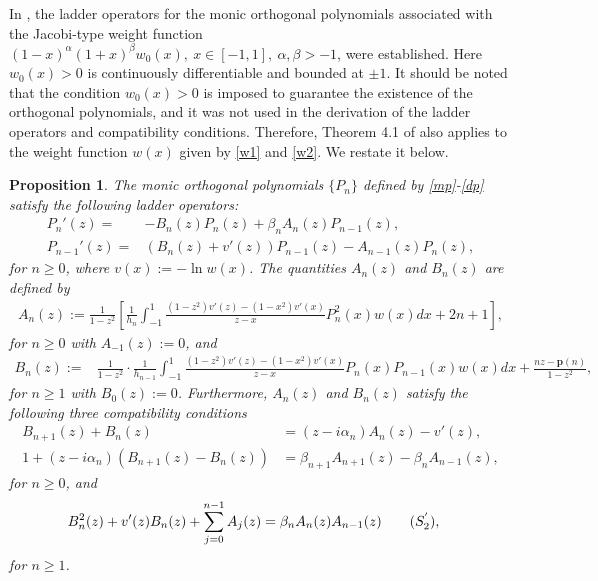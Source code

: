\documentclass[11pt,a4paper]{article}
\newtheorem{proposition}[theorem]{Proposition}
\numberwithin{equation}{section}
\begin{document}
In \cite{LyuLyu25}, the ladder operators for the monic orthogonal polynomials associated with the Jacobi-type weight function
$(1-x)^{\alpha}(1+x)^{\beta}w_0(x),~ x\in[-1,1],~\alpha,\beta>-1$,
were established. Here $w_0(x)>0$ is continuously differentiable and bounded at $\pm1$. It should be noted that the condition $w_0(x)>0$ is imposed to guarantee the existence of the orthogonal polynomials, and it was not used in the derivation of the ladder operators and compatibility conditions. Therefore, Theorem 4.1 of \cite{LyuLyu25} also applies to the weight function $w(x)$ given by \eqref{w1} and \eqref{w2}. We restate it below.
\begin{proposition}
The monic orthogonal polynomials $\{P_n\}$ defined by \eqref{mp}-\eqref{dp} satisfy the following ladder operators:
\begin{align}
P_n'(z)=&-B_n(z)P_n(z)+\beta_nA_n(z)P_{n-1}(z),\label{loJ}\\
P_{n-1}'(z)=&\left(B_n(z)+v'(z)\right)P_{n-1}(z)-A_{n-1}(z)P_n(z),\label{roJ}
\end{align}
for $n\geq0$, where $v(x):=-\ln w(x)$. The quantities $A_n(z)$ and $B_n(z)$ are defined by
\begin{align}\label{An}
A_n(z):=\frac{1}{1-z^2}\left[  \frac{1}{h_n}\int_{-1}^{1}\frac{(1-z^2)v'(z)-(1-x^2)v'(x)}{z-x}P_n^2(x)w(x)dx+2n+1 \right],
\end{align}
for $n\geq0$ with $A_{-1}(z):=0$, and
\begin{align}\label{Bn}		 B_n(z):=&\frac{1}{1-z^2}\cdot\frac{1}{h_{n-1}}\int_{-1}^{1}\frac{(1-z^2)v'(z)-(1-x^2)v'(x)}{z-x}P_n(x)P_{n-1}(x)w(x)dx+\frac{nz-\textbf{p}(n)}{1-z^2}, \end{align}
for $n\geq1$ with $B_0(z):=0$. Furthermore, $A_n(z)$ and $B_n(z)$ satisfy the following three compatibility conditions
 \begin{align}
B_{n+1}(z)+B_n(z)&=(z-i\alpha_n)A_n(z)-v'(z)\tag{$S_1$},\\
1+(z-i\alpha_n)(B_{n+1}(z)-B_n(z))&=\beta_{n+1}A_{n+1}(z)-\beta_nA_{n-1}(z)\tag{$S_2$},			 \end{align}
for $n\geq0$, and
\begin{align}
B^2_n(z)+v'(z)B_n(z)+\sum_{j=0}^{n-1}A_j(z)&=\beta_nA_n(z)A_{n-1}(z)\tag{$S^{'}_2$},
\end{align}
for $n\geq1$.
\end{proposition}
\end{document}
